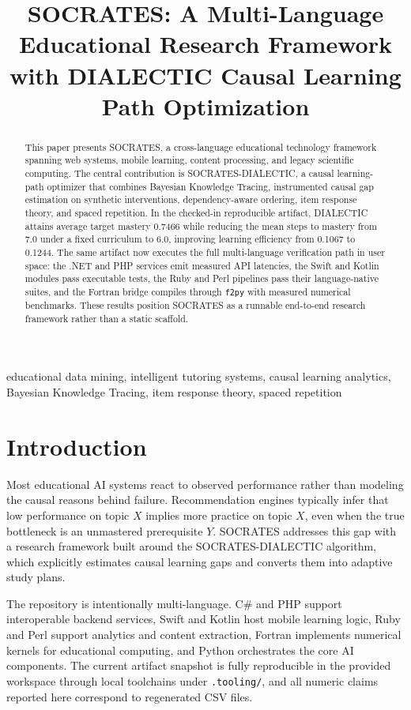 \documentclass[conference]{IEEEtran}
\title{SOCRATES: A Multi-Language Educational Research Framework with DIALECTIC Causal Learning Path Optimization}
\author{
\IEEEauthorblockN{George David Tsitlauri}
\IEEEauthorblockA{\textit{Dept. of Informatics \& Telecommunications}\\
\textit{University of Thessaly, Greece}\\
gdtsitlauri@gmail.com}
}
\begin{document}
\maketitle

\begin{abstract}
This paper presents SOCRATES, a cross-language educational technology framework spanning web systems, mobile learning, content processing, and legacy scientific computing. The central contribution is SOCRATES-DIALECTIC, a causal learning-path optimizer that combines Bayesian Knowledge Tracing, instrumented causal gap estimation on synthetic interventions, dependency-aware ordering, item response theory, and spaced repetition. In the checked-in reproducible artifact, DIALECTIC attains average target mastery 0.7466 while reducing the mean steps to mastery from 7.0 under a fixed curriculum to 6.0, improving learning efficiency from 0.1067 to 0.1244. The same artifact now executes the full multi-language verification path in user space: the .NET and PHP services emit measured API latencies, the Swift and Kotlin modules pass executable tests, the Ruby and Perl pipelines pass their language-native suites, and the Fortran bridge compiles through \texttt{f2py} with measured numerical benchmarks. These results position SOCRATES as a runnable end-to-end research framework rather than a static scaffold.
\end{abstract}

\begin{IEEEkeywords}
educational data mining, intelligent tutoring systems, causal learning analytics, Bayesian Knowledge Tracing, item response theory, spaced repetition
\end{IEEEkeywords}

\section{Introduction}
Most educational AI systems react to observed performance rather than modeling the causal reasons behind failure. Recommendation engines typically infer that low performance on topic $X$ implies more practice on topic $X$, even when the true bottleneck is an unmastered prerequisite $Y$. SOCRATES addresses this gap with a research framework built around the SOCRATES-DIALECTIC algorithm, which explicitly estimates causal learning gaps and converts them into adaptive study plans.

The repository is intentionally multi-language. C\# and PHP support interoperable backend services, Swift and Kotlin host mobile learning logic, Ruby and Perl support analytics and content extraction, Fortran implements numerical kernels for educational computing, and Python orchestrates the core AI components. The current artifact snapshot is fully reproducible in the provided workspace through local toolchains under \texttt{.tooling/}, and all numeric claims reported here correspond to regenerated CSV files.
\end{document}
